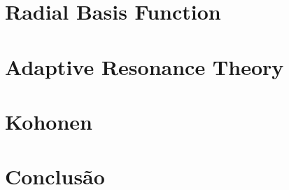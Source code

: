 \section{Radial Basis Function}
\label{sec:radial-basis-function}

\section{Adaptive Resonance Theory}
\label{sec:adaptive-resonance-theory}


\section{Kohonen}
\label{sec:kohonen}


\section{Conclusão}
\label{sec:conclusão}
